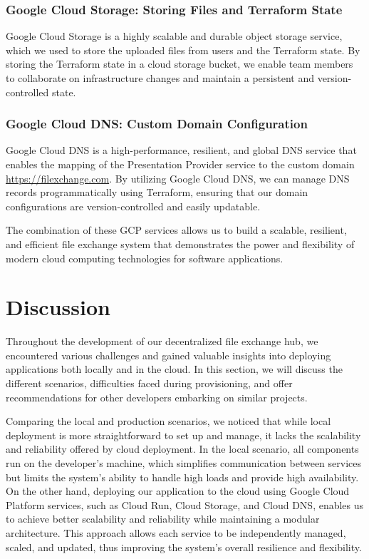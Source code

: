 \documentclass[a4paper,fleqn]{cas-dc}
\begin{document}
\subsubsection{Google Cloud Storage: Storing Files and Terraform State}

Google Cloud Storage is a highly scalable and durable object storage service, which we used to store the uploaded files from users and the Terraform state. By storing the Terraform state in a cloud storage bucket, we enable team members to collaborate on infrastructure changes and maintain a persistent and version-controlled state.

\subsubsection{Google Cloud DNS: Custom Domain Configuration}

Google Cloud DNS is a high-performance, resilient, and global DNS service that enables the mapping of the Presentation Provider service to the custom domain \url{https://filexchange.com}. By utilizing Google Cloud DNS, we can manage DNS records programmatically using Terraform, ensuring that our domain configurations are version-controlled and easily updatable.

The combination of these GCP services allows us to build a scalable, resilient, and efficient file exchange system that demonstrates the power and flexibility of modern cloud computing technologies for software applications.

\section{Discussion} \label{sec:discussion}

Throughout the development of our decentralized file exchange hub, we encountered various challenges and gained valuable insights into deploying applications both locally and in the cloud. In this section, we will discuss the different scenarios, difficulties faced during provisioning, and offer recommendations for other developers embarking on similar projects.

Comparing the local and production scenarios, we noticed that while local deployment is more straightforward to set up and manage, it lacks the scalability and reliability offered by cloud deployment. In the local scenario, all components run on the developer's machine, which simplifies communication between services but limits the system's ability to handle high loads and provide high availability. On the other hand, deploying our application to the cloud using Google Cloud Platform services, such as Cloud Run, Cloud Storage, and Cloud DNS, enables us to achieve better scalability and reliability while maintaining a modular architecture. This approach allows each service to be independently managed, scaled, and updated, thus improving the system's overall resilience and flexibility.
\end{document}
